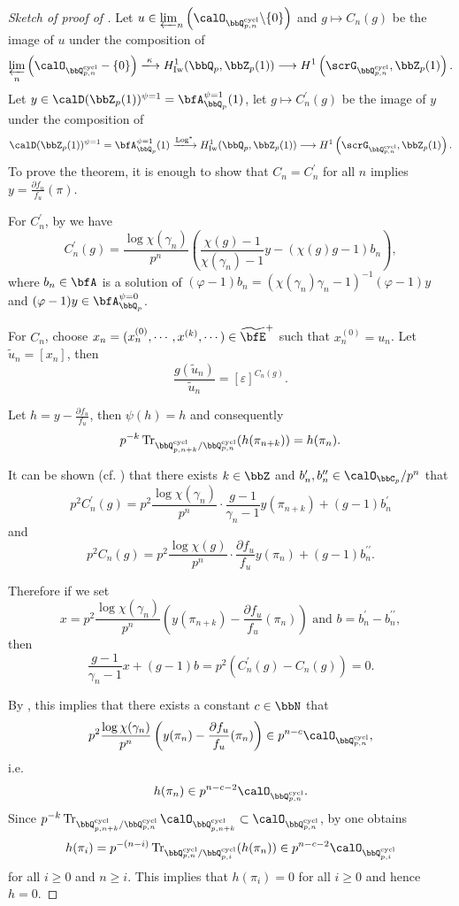 \documentclass[a4paper,oneside]{amsart}
\numberwithin{equation}{section}
\numberwithin{figure}{section}
\begin{document}
\begin{proof}[Sketch of proof of ]
    Let $u\in\varprojlim_n \left(\calO_{\bbQ_{p,n}^{\opn{cycl}}}\backslash\{0\}\right)$  and $g\longmapsto C_n(g)$ be the image of $u$ under the composition of
    $$\varprojlim_n\left(\calO_{\bbQ_{p,n}^{\opn{cycl}}}-\{0\}\right)\xlto{\kappa}H_{\opn{Iw}}^1(\bbQ_p,\bbZ_p(1))\lto H^1\left(\scrG_{\bbQ_{p,n}^{\opn{cycl}}},\bbZ_p(1)\right).$$
    Let $y\in\calD(\bbZ_p(1))^{\psi=1}=\bfA_{\bbQ_p}^{\psi=1}(1)$, let $g\longmapsto C_n^\prime(g)$ be the image of $y$ under the composition of
    $$\calD(\bbZ_p(1))^{\psi=1}=\bfA_{\bbQ_p}^{\psi=1}(1)\xlto{\opn{Log}^*}H^1_{\opn{Iw}}(\bbQ_p,\bbZ_p(1))\lto H^1\left(\scrG_{\bbQ_{p,n}^{\opn{cycl}}},\bbZ_p(1)\right).$$
    To prove the theorem, it is enough to show that $C_n=C_n^\prime$  for all $n$ implies $y=\frac{\partial f_u}{f_u}(\pi)$.

    For $C_n^\prime$, by  we have
    $$C_n^\prime(g)=\frac{\log \chi(\gamma_n)}{p^n}\left(
        \frac{\chi(g)-1}{\chi(\gamma_n)-1}y-(\chi(g)g-1)b_n\right),$$
    where $b_n\in\bfA$ is a solution of $(\varphi-1)b_n=(\chi(\gamma_n)\gamma_n-1)^{-1}(\varphi-1)y$ and $(\varphi-1)y\in\bfA_{\bbQ_p}^{\psi=0}$.

    For $C_n$, choose $x_n=(x_n^{(0)},\cdots,x^{(k)},\cdots)\in\widetilde{\bfE}^+$ such that $x_n^{(0)}=u_n$. Let $\tilde{u}_n=[x_n]$, then
    $$\frac{g(\tilde{u}_n)}{\tilde{u}_n}=[\varepsilon]^{C_n(g)}.$$

    Let $h=y-\frac{\partial f_u}{f_u}$, then $\psi(h)=h$ and consequently
    \begin{equation}\label{eq:24892}
        p^{-k}\Tr_{\bbQ_{p,n+k}^{\opn{cycl}}/\bbQ_{p,n}^{\opn{cycl}}}(h(\pi_{n+k}))=h(\pi_n).
    \end{equation}

    It can be shown (cf. \cite[Proposition 7.5.2]{colmez_fontaines_nodate}) that there exists $k\in\bbZ$ and $b_n^\prime,b_n^{\prime\prime}\in\calO_{\bbC_p}/p^n$ that
    $$p^2C_n^\prime(g)=p^2\frac{\log\chi(\gamma_n)}{p^n}\cdot \frac{g-1}{\gamma_n-1}y(\pi_{n+k})+(g-1)b_n^\prime$$
    and
    $$p^2C_n(g)=p^2\frac{\log\chi(g)}{p^n}\cdot \frac{\partial f_u}{f_u}y(\pi_n)+(g-1)b_n^{\prime\prime}.$$

    Therefore if we set
    $$x=p^2\frac{\log\chi(\gamma_n)}{p^n}\left(y(\pi_{n+k})-\frac{\partial f_u}{f_u}(\pi_n)\right) \text{ and }b=b_n^\prime-b_n^{\prime\prime},$$
    then
    $$\frac{g-1}{\gamma_n-1}x+(g-1)b=p^2(C_n^\prime(g)-C_n(g))=0.$$

    By \cite[Proposition 7.5.2]{colmez_fontaines_nodate}, this implies that there exists a constant $c\in\bbN$ that
    $$p^2\frac{\log\chi(\gamma_n)}{p^n}\left(y(\pi_{n})-\frac{\partial f_u}{f_u}(\pi_n)\right)\in p^{n-c}\calO_{\bbQ_{p,n}^{\opn{cycl}}},$$
    i.e.
    $$h(\pi_n)\in p^{n-c-2}\calO_{\bbQ_{p,n}^{\opn{cycl}}}.$$
    Since $p^{-k}\Tr_{\bbQ_{p,n+k}^{\opn{cycl}}/\bbQ_{p,n}^{\opn{cycl}}}\calO_{\bbQ_{p,n+k}^{\opn{cycl}}}\subset \calO_{\bbQ_{p,n}^{\opn{cycl}}}$, by  one obtains
    $$h(\pi_i)=p^{-(n-i)}\Tr_{\bbQ_{p,n}^{\opn{cycl}}/\bbQ_{p,i}^{\opn{cycl}}}(h(\pi_n))\in p^{n-c-2}\calO_{\bbQ_{p,i}^{\opn{cycl}}}$$
    for all $i\geq 0$ and $n\geq i$. This implies that $h(\pi_i)=0$ for all $i\geq 0$ and hence $h=0$.
\end{proof}
\printbibliography
\end{document}
